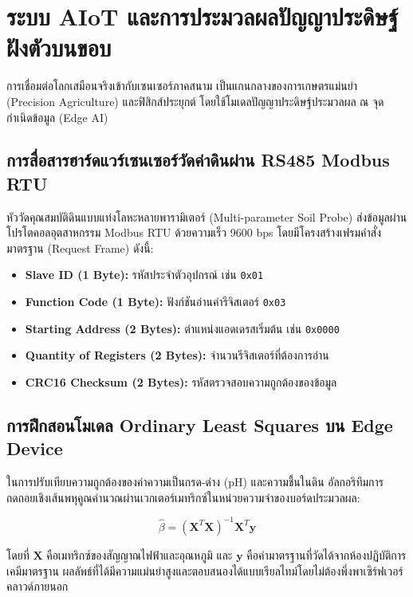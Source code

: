 \chapter{ระบบ AIoT และการประมวลผลปัญญาประดิษฐ์ฝังตัวบนขอบ}

การเชื่อมต่อโลกเสมือนจริงเข้ากับเซนเซอร์ภาคสนาม เป็นแกนกลางของการเกษตรแม่นยำ (Precision Agriculture) และฟิสิกส์ประยุกต์ โดยใช้โมเดลปัญญาประดิษฐ์ประมวลผล ณ จุดกำเนิดข้อมูล (Edge AI)

\section{การสื่อสารฮาร์ดแวร์เซนเซอร์วัดค่าดินผ่าน RS485 Modbus RTU}

หัววัดคุณสมบัติดินแบบแท่งโลหะหลายพารามิเตอร์ (Multi-parameter Soil Probe) ส่งข้อมูลผ่านโปรโตคอลอุตสาหกรรม Modbus RTU ด้วยความเร็ว 9600 bps โดยมีโครงสร้างเฟรมคำสั่งมาตรฐาน (Request Frame) ดังนี้:

\begin{itemize}
    \item \textbf{Slave ID (1 Byte):} รหัสประจำตัวอุปกรณ์ เช่น \texttt{0x01}
    \item \textbf{Function Code (1 Byte):} ฟังก์ชันอ่านค่ารีจิสเตอร์ \texttt{0x03}
    \item \textbf{Starting Address (2 Bytes):} ตำแหน่งแอดเดรสเริ่มต้น เช่น \texttt{0x0000}
    \item \textbf{Quantity of Registers (2 Bytes):} จำนวนรีจิสเตอร์ที่ต้องการอ่าน
    \item \textbf{CRC16 Checksum (2 Bytes):} รหัสตรวจสอบความถูกต้องของข้อมูล
\end{itemize}

\section{การฝึกสอนโมเดล Ordinary Least Squares บน Edge Device}

ในการปรับเทียบความถูกต้องของค่าความเป็นกรด-ด่าง (pH) และความชื้นในดิน อัลกอริทึมการถดถอยเชิงเส้นพหุคูณคำนวณผ่านเวกเตอร์เมทริกซ์ในหน่วยความจำของบอร์ดประมวลผล:

\begin{equation}
\hat{\beta} = (\mathbf{X}^T \mathbf{X})^{-1} \mathbf{X}^T \mathbf{y}
\end{equation}

โดยที่ $\mathbf{X}$ คือเมทริกซ์ของสัญญาณไฟฟ้าและอุณหภูมิ และ $\mathbf{y}$ คือค่ามาตรฐานที่วัดได้จากห้องปฏิบัติการเคมีมาตรฐาน ผลลัพธ์ที่ได้มีความแม่นยำสูงและตอบสนองได้แบบเรียลไทม์โดยไม่ต้องพึ่งพาเซิร์ฟเวอร์คลาวด์ภายนอก
